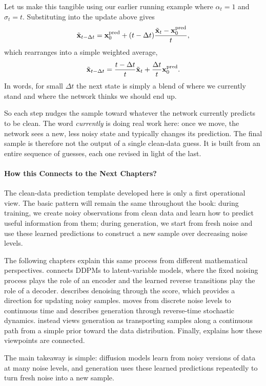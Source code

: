 Let us make this tangible using our earlier running example where $\alpha_t=1$ and $\sigma_t=t$. Substituting into the update above gives
\[
\tilde{{\mathbf{x}}}_{t-\Delta t}
=
{\mathbf{x}}_0^{\mathrm{pred}}
+
(t-\Delta t)
\frac{
\tilde{{\mathbf{x}}}_t-{\mathbf{x}}_0^{\mathrm{pred}}
}{
t
},
\]
which rearranges into a simple weighted average,
\[
\tilde{{\mathbf{x}}}_{t-\Delta t}
=
\frac{t-\Delta t}{t}\tilde{{\mathbf{x}}}_t
+
\frac{\Delta t}{t}{\mathbf{x}}_0^{\mathrm{pred}}.
\]
In words, for small $\Delta t$ the next state is simply a blend of where
we currently stand and where the network thinks we should end up.

So each step nudges the sample toward whatever the network currently
predicts to be clean. The word \emph{currently} is doing real work here:
once we move, the network sees a new, less noisy state and typically
changes its prediction. The final sample is therefore not the output of
a single clean-data guess. It is built from an entire sequence of
guesses, each one revised in light of the last.

\paragraph{How this Connects to the Next Chapters?}

The clean-data prediction template developed here is only a first operational
view. The basic pattern will remain the same throughout the book: during
training, we create noisy observations from clean data and learn how to
predict useful information from them; during generation, we start from fresh
noise and use these learned predictions to construct a new sample over
decreasing noise levels.

The following chapters explain this same process from different mathematical
perspectives.  connects DDPMs to latent-variable models,
where the fixed noising process plays the role of an encoder and the learned
reverse transitions play the role of a decoder.
 describes denoising through the score, which provides a
direction for updating noisy samples.
 moves from discrete noise levels to continuous time and
describes generation through reverse-time stochastic dynamics.
 instead views generation as transporting samples along a
continuous path from a simple prior toward the data distribution.
Finally,  explains how these viewpoints are connected.

The main takeaway is simple: diffusion models learn from noisy versions of
data at many noise levels, and generation uses these learned predictions
repeatedly to turn fresh noise into a new sample.